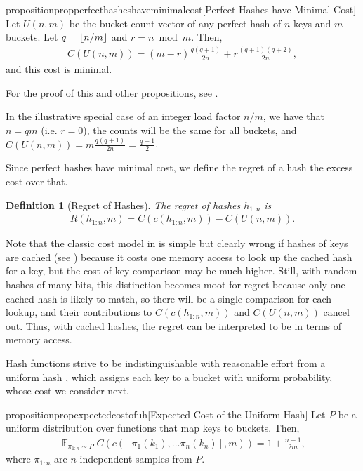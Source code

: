 \documentclass[sigconf]{acmart}
\DeclarePairedDelimiter{\floor}{\lfloor}{\rfloor}
\newcommand{\E}{\mathop{{}\mathbb{E}}}
\newtheorem{definition}[theorem]{Definition}
\renewcommand{\label}[1]{%
    \gdef\sfname{sf:##1}}%
\begin{document}
\begin{restatable}{proposition}{propperfecthasheshaveminimalcost}[Perfect Hashes have Minimal Cost]
Let $U(n,m)$ be the bucket count vector of any perfect hash of $n$ keys and $m$ buckets.
Let $q=\floor{n/m}$ and $r=n \bmod m$.
Then,
\begin{align*}
C(U(n,m)) = (m-r)\frac{q(q+1)}{2n} + r\frac{(q+1)(q+2)}{2n},
\end{align*}
and this cost is minimal.
\end{restatable}
\noindent For the proof of this and other propositions, see .

In the illustrative special case of an integer load factor $n/m$, we have that $n=qm$ (i.e. $r = 0$), the counts will be the same for all buckets, and $C(U(n,m)) = m\frac{q(q+1)}{2n} = \frac{q+1}{2}$.

Since perfect hashes have minimal cost, we define the regret of a hash the excess cost over that.
\begin{definition}[Regret of Hashes]
\label{def:regret}
The regret of hashes $h_{1:n}$ is
\begin{align*}
R(h_{1:n},m) = C(c(h_{1:n},m))- C(U(n,m)).
\end{align*}
\end{definition}

Note that the classic cost model in  is simple but clearly wrong if hashes of keys are cached (see ) because it costs one memory access to look up the cached hash for a key, but the cost of key comparison may be much higher.
Still, with random hashes of many bits, this distinction becomes moot for regret because only one cached hash is likely to match, so there will be a single comparison for each lookup, and their contributions to $C(c(h_{1:n},m))$ and $C(U(n,m))$ cancel out.
Thus, with cached hashes, the regret can be interpreted to be in terms of memory access.

Hash functions strive to be indistinguishable with reasonable effort from a uniform hash \citep{10.5555/1213024}, which assigns each key to a bucket with uniform probability, whose cost we consider next.

\begin{restatable}{proposition}{propexpectedcostofuh}[Expected Cost of the Uniform Hash]
\label{prop:expected-cost-of-uh}
Let $P$ be a uniform distribution over functions that map keys to buckets.
Then,
\begin{align*}
\E_{\pi_{1:n} \sim P} C(c([\pi_1(k_1), \dots \pi_n(k_n)],m)) = 1+\frac{n-1}{2m},
\end{align*}
where $\pi_{1:n}$ are $n$ independent samples from $P$.
\end{restatable}
\end{document}
